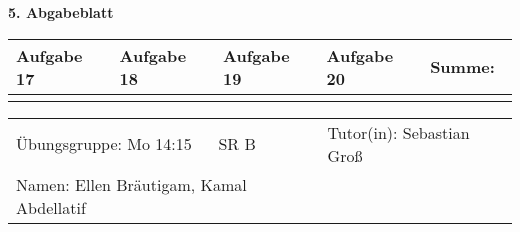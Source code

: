 \documentclass[a4paper, 12pt]{scrartcl}
\begin{document}
\begin{center}
    \textbf{5. Abgabeblatt}\\[2em]
	\def\arraystretch{2}
    \begin{tabular}{|l|l|l|l||p{18mm}|}
        \hline
        Aufgabe 17 & Aufgabe 18 & Aufgabe 19 & Aufgabe 20 & Summe:~ \\
        \hline &&&&\\
         \hline  
    \end{tabular}
\end{center}
\begingroup
\def\arraystretch{1.5}
\begin{tabular}{p{}p{}}
	\hline
    Übungsgruppe: Mo 14:15 ~~ SR B& Tutor(in): Sebastian Groß\\
    Namen: Ellen Bräutigam, Kamal Abdellatif &\\
    \hline
\end{tabular}
\endgroup\\
\end{document}
